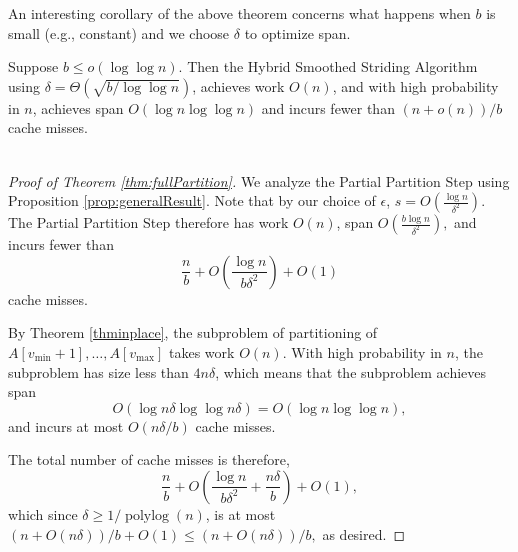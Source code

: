 \documentclass[twoside,leqno,twocolumn]{article}
\newcommand{\polylog}{\operatorname{polylog}}
\begin{document}

An interesting corollary of the above theorem concerns what happens when $b$ is small (e.g., constant) and we choose $\delta$ to optimize span. 

\begin{corollary}
	\label{cor:fullPartition}
Suppose $b \le o(\log \log n)$. Then the Hybrid Smoothed Striding
Algorithm using $\delta = \Theta\left(\sqrt{b/\log\log n}\right)$,
achieves work $O(n)$, and with high probability in $n$, achieves
span $O(\log n \log\log n)$ and incurs fewer than $(n+o(n))/b$
cache misses.\\\\
\end{corollary}

\begin{proof}[Proof of Theorem \ref{thm:fullPartition}]
  
  We analyze the Partial Partition Step using Proposition
  \ref{prop:generalResult}. Note that by our choice of $\epsilon$,
  $s=O\left(\frac{\log n}{\delta^2}\right)$.  The Partial Partition
  Step therefore has work $O(n)$, span $O\left(\frac{b\log
    n}{\delta^2}\right),$ and incurs fewer than
    $$\frac{n}{b}+O\left(\frac{\log n}{b\delta^2}\right)+O(1)$$ 
  cache misses.

  By Theorem \ref{thminplace}, the subproblem of partitioning of \\ $A[v_{\text{min}} + 1], \ldots,
   A[v_{\text{max}}]$ takes work $O(n)$. With high probability in $n$,
  the subproblem has size less than $4n\delta$, which means that the subproblem
  achieves span
  $$O(\log n\delta \log\log n\delta) = O(\log n \log\log n),$$
  and incurs at most $O(n \delta / b)$ cache misses.

  The total number of cache misses is therefore,
  $$\frac{n}{b}+O\left(\frac{\log n}{b\delta^2} +
  \frac{n\delta}{b}\right)+O(1),$$ which since $\delta \ge 1 /
  \polylog(n)$, is at most $(n+O(n\delta))/b + O(1) \le (n + O(n
  \delta)) / b,$ as desired.
\end{proof}
\end{document}
